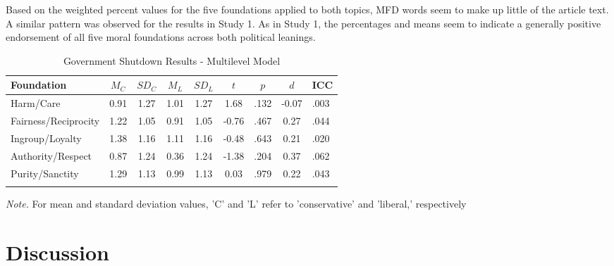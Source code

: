 \documentclass[
  man,floatsintext]{apa6}
\begin{document}
Based on the weighted percent values for the five foundations applied to both topics, MFD words seem to make up little of the article text. A similar pattern was observed for the results in Study 1. As in Study 1, the percentages and means seem to indicate a generally positive endorsement of all five moral foundations across both political leanings.

\begin{table}[h]

\begin{center}
\begin{threeparttable}

\caption{\label{tab:exp2-tablegs}Government Shutdown Results - Multilevel Model}

\footnotesize{

\begin{tabular}{lcccccccl}
\toprule
Foundation & $M_C$ & $SD_C$ & $M_L$ & $SD_L$ & $t$ & $p$ & $d$ & ICC\\
\midrule
Harm/Care & 0.91 & 1.27 & 1.01 & 1.27 & 1.68 & .132 & -0.07 & .003\\
Fairness/Reciprocity & 1.22 & 1.05 & 0.91 & 1.05 & -0.76 & .467 & 0.27 & .044\\
Ingroup/Loyalty & 1.38 & 1.16 & 1.11 & 1.16 & -0.48 & .643 & 0.21 & .020\\
Authority/Respect & 0.87 & 1.24 & 0.36 & 1.24 & -1.38 & .204 & 0.37 & .062\\
Purity/Sanctity & 1.29 & 1.13 & 0.99 & 1.13 & 0.03 & .979 & 0.22 & .043\\
\bottomrule
\addlinespace
\end{tabular}

}

\begin{tablenotes}[para]
\normalsize{\textit{Note.} For mean and standard deviation values, 'C' and 'L' refer to 'conservative' and 'liberal,' respectively}
\end{tablenotes}

\end{threeparttable}
\end{center}

\end{table}

\hypertarget{discussion-1}{%
\section{Discussion}\label{discussion-1}}
\end{document}
